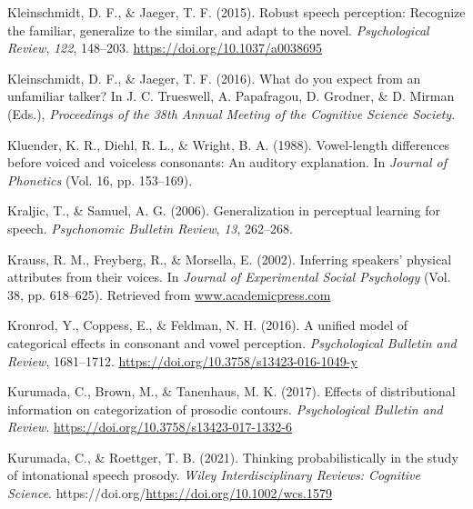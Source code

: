 \documentclass[
  11pt,
  english,
  man,floatsintext]{apa6}
\newlength{\cslhangindent}
\newlength{\cslentryspacingunit} %
\newenvironment{CSLReferences}[2] %
 {%
  \setlength{\parindent}{0pt}
  \ifodd #1
  \let\oldpar\par
  \def\par{\hangindent=\cslhangindent\oldpar}
  \fi
  \setlength{\parskip}{#2\cslentryspacingunit}
 }%
 {}
\begin{document}
\begin{CSLReferences}{1}{0}
\leavevmode{}%
Kleinschmidt, D. F., \& Jaeger, T. F. (2015). Robust speech perception: Recognize the familiar, generalize to the similar, and adapt to the novel. \emph{Psychological Review}, \emph{122}, 148--203. \url{https://doi.org/10.1037/a0038695}

\leavevmode{}%
Kleinschmidt, D. F., \& Jaeger, T. F. (2016). What do you expect from an unfamiliar talker? In J. C. Trueswell, A. Papafragou, D. Grodner, \& D. Mirman (Eds.), \emph{Proceedings of the 38th Annual Meeting of the Cognitive Science Society}.

\leavevmode{}%
Kluender, K. R., Diehl, R. L., \& Wright, B. A. (1988). Vowel-length differences before voiced and voiceless consonants: An auditory explanation. In \emph{Journal of Phonetics} (Vol. 16, pp. 153--169).

\leavevmode{}%
Kraljic, T., \& Samuel, A. G. (2006). Generalization in perceptual learning for speech. \emph{Psychonomic Bulletin Review}, \emph{13}, 262--268.

\leavevmode{}%
Krauss, R. M., Freyberg, R., \& Morsella, E. (2002). Inferring speakers' physical attributes from their voices. In \emph{Journal of Experimental Social Psychology} (Vol. 38, pp. 618--625). Retrieved from \href{https://www.academicpress.com}{www.academicpress.com}

\leavevmode{}%
Kronrod, Y., Coppess, E., \& Feldman, N. H. (2016). A unified model of categorical effects in consonant and vowel perception. \emph{Psychological Bulletin and Review}, 1681--1712. \url{https://doi.org/10.3758/s13423-016-1049-y}

\leavevmode{}%
Kurumada, C., Brown, M., \& Tanenhaus, M. K. (2017). Effects of distributional information on categorization of prosodic contours. \emph{Psychological Bulletin and Review}. \url{https://doi.org/10.3758/s13423-017-1332-6}

\leavevmode{}%
Kurumada, C., \& Roettger, T. B. (2021). Thinking probabilistically in the study of intonational speech prosody. \emph{Wiley Interdisciplinary Reviews: Cognitive Science}. https://doi.org/\url{https://doi.org/10.1002/wcs.1579}


\end{CSLReferences}
\end{document}
